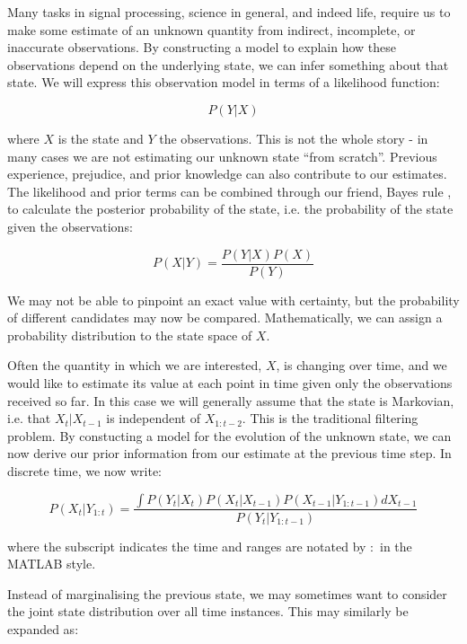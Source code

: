 Many tasks in signal processing, science in general, and indeed life, require us to make some estimate of an unknown quantity from indirect, incomplete, or inaccurate observations. By constructing a model to explain how these observations depend on the underlying state, we can infer something about that state. We will express this observation model in terms of a likelihood function:

\begin{equation}
P(Y|X)
\label{eq:LH}
\end{equation}

where $X$ is the state and $Y$ the observations. This is not the whole story - in many cases we are not estimating our unknown state ``from scratch''. Previous experience, prejudice, and prior knowledge can also contribute to our estimates. The likelihood and prior terms can be combined through our friend, Bayes rule \cite{Laplace1774}, to calculate the posterior probability of the state, i.e. the probability of the state given the observations:

\begin{equation}
P(X|Y) = \frac{P(Y|X)P(X)}{P(Y)}
\label{eq:BayesRule}
\end{equation}

We may not be able to pinpoint an exact value with certainty, but the probability of different candidates may now be compared. Mathematically, we can assign a probability distribution to the state space of $X$.

Often the quantity in which we are interested, $X$, is changing over time, and we would like to estimate its value at each point in time given only the observations received so far. In this case we will generally assume that the state is Markovian, i.e. that $X_t|X_{t-1}$ is independent of $X_{1:t-2}$. This is the traditional filtering problem. By constucting a model for the evolution of the unknown state, we can now derive our prior information from our estimate at the previous time step. In discrete time, we now write:

\begin{equation}
P(X_t|Y_{1:t}) = \frac{\int P(Y_t|X_t)P(X_t|X_{t-1})P(X_{t-1}|Y_{1:t-1}) dX_{t-1}}{P(Y_t|Y_{1:t-1})}
\label{eq:SeqBayesRule}
\end{equation}

where the subscript indicates the time and ranges are notated by $:$ in the MATLAB style.

Instead of marginalising the previous state, we may sometimes want to consider the joint state distribution over all time instances. This may similarly be expanded as:

